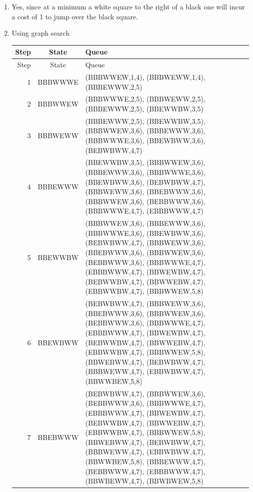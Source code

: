 \documentclass[10pt]{article}
\begin{document}
\begin{enumerate}
\begin{enumerate}
  \item %
    Yes, since at a minimum a white square to the right of a black one will
    incur a cost of 1 to jump over the black square.
  \item %
    Using graph search
    \begin{longtable}[t]{|r|c|p{20em}|}
    \hline
    Step & State   & Queue \\
    \hline \endfirsthead
    \hline
    Step & State   & Queue \\
    \hline \endhead
    1    & BBBWWWE & (BBBWWEW,1,4), (BBBWEWW,1,4), (BBBEWWW,2,5) \\
    \hline
    2    & BBBWWEW & (BBBWWWE,2,5), (BBBWEWW,2,5),
                     (BBBEWWW,2,5), (BBEWWBW,3,5) \\
    \hline
    3    & BBBWEWW & (BBBEWWW,2,5), (BBEWWBW,3,5), (BBBWWEW,3,6), (BBBEWWW,3,6),
                     (BBBWWWE,3,6), (BBEWBWW,3,6), (BEBWBWW,4,7) \\
    \hline
    4    & BBBEWWW & (BBEWWBW,3,5), (BBBWWEW,3,6), (BBBEWWW,3,6), (BBBWWWE,3,6),
                     (BBEWBWW,3,6), (BEBWBWW,4,7), (BBBWEWW,3,6), (BBEBWWW,3,6),
                     (BBBWWEW,3,6), (BEBBWWW,3,6), 
                     (BBBWWWE,4,7), (EBBBWWW,4,7) \\
    \hline
    5    & BBEWWBW & (BBBWWEW,3,6), (BBBEWWW,3,6), (BBBWWWE,3,6), (BBEWBWW,3,6),
                     (BEBWBWW,4,7), (BBBWEWW,3,6), (BBEBWWW,3,6), (BBBWWEW,3,6),
                     (BEBBWWW,3,6), (BBBWWWE,4,7), (EBBBWWW,4,7), (BBWEWBW,4,7),
                     (BEBWWBW,4,7), (BBWWEBW,4,7), (EBBWWBW,4,7), 
                     (BBBWWEW,5,8) \\
    \hline
    6    & BBEWBWW & (BEBWBWW,4,7), (BBBWEWW,3,6), (BBEBWWW,3,6), (BBBWWEW,3,6),
                     (BEBBWWW,3,6), (BBBWWWE,4,7), (EBBBWWW,4,7), (BBWEWBW,4,7),
                     (BEBWWBW,4,7), (BBWWEBW,4,7), (EBBWWBW,4,7), (BBBWWEW,5,8),
                     (BBWEBWW,4,7), (BEBWBWW,4,7), (BBBWEWW,4,7), (EBBWBWW,4,7),
                     (BBWWBEW,5,8) \\
    \hline
    7    & BBEBWWW & (BEBWBWW,4,7), (BBBWWEW,3,6), (BEBBWWW,3,6), (BBBWWWE,4,7),
                     (EBBBWWW,4,7), (BBWEWBW,4,7), (BEBWWBW,4,7), (BBWWEBW,4,7),
                     (EBBWWBW,4,7), (BBBWWEW,5,8), (BBWEBWW,4,7), (BEBWBWW,4,7),
                     (BBBWEWW,4,7), (EBBWBWW,4,7), (BBWWBEW,5,8), (BBBEWWW,4,7),
                     (BEBBWWW,4,7), (EBBBWWW,4,7),
                     (BBWBEWW,4,7), (BBWBWEW,5,8) \\

\end{longtable}
\end{enumerate}
\end{enumerate}
\end{document}
